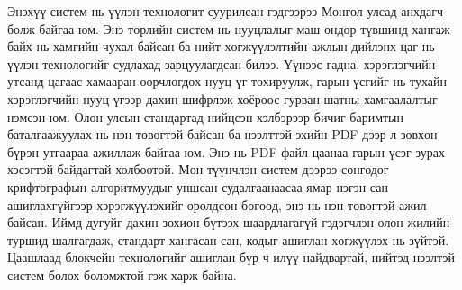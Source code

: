 \documentclass[12pt,A4]{report}
\begin{document}
Энэхүү систем нь үүлэн технологит суурилсан гэдгээрээ Монгол улсад анхдагч болж байгаа юм. Энэ төрлийн систем нь нууцлалыг маш өндөр түвшинд хангаж байх нь хамгийн чухал байсан ба нийт хөгжүүлэлтийн ажлын дийлэнх цаг нь үүлэн технологийг судлахад зарцуулагдсан билээ. Үүнээс гадна, хэрэглэгчийн утсанд цагаас хамааран өөрчлөгдөх нууц үг тохируулж, гарын үсгийг нь тухайн хэрэглэгчийн нууц үгээр дахин шифрлэж хоёроос гурван шатны хамгаалалтыг нэмсэн юм. Олон улсын стандартад нийцсэн хэлбэрээр бичиг баримтын баталгаажуулах нь нэн төвөгтэй байсан ба нээлттэй эхийн PDF дээр л зөвхөн бүрэн утгаараа ажиллаж байгаа юм. Энэ нь PDF файл цаанаа гарын үсэг зурах хэсэгтэй байдагтай холбоотой. 
Мөн түүнчлэн систем дээрээ сонгодог крифтографын алгоритмуудыг уншсан судалгаанаасаа ямар нэгэн сан ашиглахгүйгээр хэрэгжүүлэхийг оролдсон бөгөөд, энэ нь нэн төвөгтэй ажил байсан. Иймд дугуйг дахин зохион бүтээх шаардлагагүй гэдэгчлэн олон жилийн туршид шалгагдаж, стандарт хангасан сан, кодыг ашиглан хөгжүүлэх нь зүйтэй.
Цаашлаад блокчейн технологийг ашиглан бүр ч илүү найдвартай, нийтэд нээлтэй систем болох боломжтой гэж харж байна.




\end{document}
